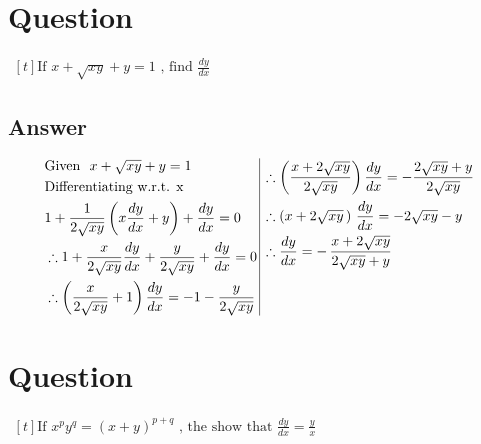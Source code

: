 \documentclass[17pt]{extarticle}
\begin{document}
\noindent
\begin{fleqn} 


\section{Question} 

$\begin{aligned}[t] 
\text{If \ } x + \sqrt{xy} + y = 1 \text{\ , \  find \ \  } \frac{dy}{dx}
\end{aligned}$

\subsection*{Answer}
\begin{equation} \nonumber
\begin{alignedat}{4}
& \text{Given \ } x + \sqrt{xy} + y = 1 \\
& \text{Differentiating w.r.t. x \ }\\
& 1 + \frac{1}{2\sqrt{xy}} \left( x\frac{dy}{dx}+y \right)+\frac{dy}{dx}=0 \\
& \therefore 1 + \frac{x}{2\sqrt{xy}} \frac{dy}{dx}+ \frac{y}{2\sqrt{xy}}+\frac{dy}{dx}=0 \\
& \therefore \left(\frac{x}{2\sqrt{xy}}+1\right) \frac{dy}{dx}=-1-\frac{y}{2\sqrt{xy}}\\
\end{alignedat}
\,
\vrule
\, 
\begin{alignedat}{4}
& \therefore \left(\frac{x+2\sqrt{xy}}{2\sqrt{xy}}\right) \frac{dy}{dx}=-\frac{2\sqrt{xy}+y}{2\sqrt{xy}}\\
& \therefore  (x+2\sqrt{xy}\,)\ \frac{dy}{dx}= -2\sqrt{xy}-y \\
& \therefore \frac{dy}{dx} =-\,\frac{x+2\sqrt{xy}}{2\sqrt{xy}+y}  \\
& \\
& \\
\end{alignedat}
\end{equation}
\section{Question} 

$\begin{aligned}[t] 
\text{If \ } x^p y^q = (x+y)^{p+q} \text{\ , \ the show that \ \  } \frac{dy}{dx}=\frac{y}{x}
\end{aligned}$


\end{fleqn}
\end{document}
